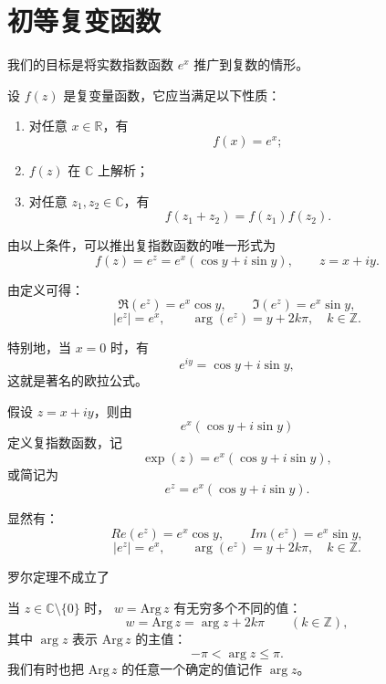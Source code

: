 \documentclass[lang=cn,10pt]{elegantbook}
\begin{document}
\section{初等复变函数}

\begin{proposition}[复平面上的指数函数]
我们的目标是将实数指数函数 $e^x$ 推广到复数的情形。

\medskip
设 $f(z)$ 是复变量函数，它应当满足以下性质：
\begin{enumerate}
  \item 对任意 $x \in \mathbb{R}$，有
  \[
    f(x) = e^x;
  \]
  \item $f(z)$ 在 $\mathbb{C}$ 上解析；
  \item 对任意 $z_1, z_2 \in \mathbb{C}$，有
  \[
    f(z_1+z_2) = f(z_1) f(z_2).
  \]
\end{enumerate}

由以上条件，可以推出复指数函数的唯一形式为
\[
f(z) = e^z = e^x (\cos y + i \sin y), \qquad z = x + i y.
\]

\medskip
由定义可得：
\[
\Re(e^z) = e^x \cos y, \qquad 
\Im(e^z) = e^x \sin y,
\]
\[
|e^z| = e^x, \qquad 
\arg(e^z) = y + 2k\pi, \quad k \in \mathbb{Z}.
\]

特别地，当 $x=0$ 时，有
\[
e^{iy} = \cos y + i \sin y,
\]
这就是著名的欧拉公式。
\end{proposition}
\begin{definition}[复指数函数]
假设 $z = x + i y$，则由
\[
e^x (\cos y + i \sin y)
\]
定义复指数函数，记
\[
\exp(z) = e^x (\cos y + i \sin y),
\]
或简记为
\[
e^z = e^x (\cos y + i \sin y).
\]

显然有：
\[
Re(e^z) = e^x \cos y, \qquad 
Im(e^z) = e^x \sin y,
\]
\[
\lvert e^z \rvert = e^x, \qquad 
\arg(e^z) = y + 2k\pi, \quad k \in \mathbb{Z}.
\]
\end{definition}
罗尔定理不成立了

\begin{definition}[辐角函数]
当 $z \in \mathbb{C}\setminus\{0\}$ 时，
$w = \mathrm{Arg}\,z$ 有无穷多个不同的值：
\[
w = \mathrm{Arg}\,z = \arg z + 2k\pi \qquad (k \in \mathbb{Z}), \tag{5.1}
\]
其中 $\arg z$ 表示 $\mathrm{Arg}\,z$ 的主值：
\[
-\pi < \arg z \leq \pi.
\]
我们有时也把 $\mathrm{Arg}\,z$ 的任意一个确定的值记作 $\arg z$。
\end{definition}
\end{document}
